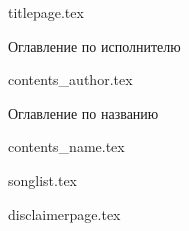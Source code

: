 \documentclass[10pt]{book}
\begin{document}

{titlepage.tex}%
\clearpage%

\setcounter{page}{1}%
\hypertarget{contents}{
\fontsize{20pt}{24pt}\centerline{Оглавление по исполнителю}
}\par\vspace{12pt}
{contents_author.tex}%
\clearpage%

\fontsize{20pt}{24pt}\centerline{Оглавление по названию}
\par\vspace{12pt}
{contents_name.tex}%

\clearpage%

{songlist.tex}

{disclaimerpage.tex}%
\end{document}
